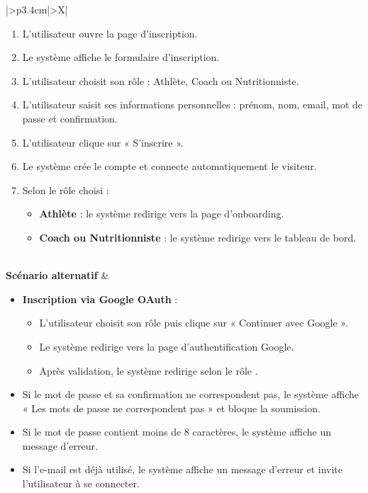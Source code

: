 \documentclass[a4paper,12pt]{report}
\begin{document}
\begin{table}[H]
\begin{tabularx}{\textwidth}{|>{\RaggedRight\arraybackslash}p{3.4cm}|>{\RaggedRight\arraybackslash}X|}
\begin{minipage}[t]{\linewidth}
\begin{enumerate}[label=\arabic*., leftmargin=*, topsep=0pt, itemsep=1pt]
    \item L'utilisateur ouvre la page d'inscription.
    \item Le système affiche le formulaire d'inscription.
    \item L'utilisateur choisit son rôle : Athlète, Coach ou Nutritionniste. 
    \item L'utilisateur saisit ses informations personnelles : prénom, nom, email, mot de passe et confirmation. 
    \item L'utilisateur clique sur « S'inscrire ».
    \item Le système crée le compte et connecte automatiquement le visiteur.
    \item Selon le rôle choisi :
    \begin{itemize}[leftmargin=*, topsep=1pt, itemsep=1pt]
        \item \textbf{Athlète} : le système redirige vers la page d'onboarding.
        \item \textbf{Coach ou Nutritionniste} : le système redirige vers le tableau de bord.
    \end{itemize}
\end{enumerate}
\vspace{2pt}
\end{minipage} \\
\hline
\textbf{Scénario alternatif} &
\begin{minipage}[t]{\linewidth}
\vspace{2pt}
\begin{itemize}[leftmargin=*, topsep=0pt, itemsep=1pt]
    \item \textbf{Inscription via Google OAuth} :
    \begin{itemize}[leftmargin=*, topsep=1pt, itemsep=1pt]
        \item L'utilisateur choisit son rôle 
puis clique sur « Continuer avec Google ».
        \item Le système redirige vers la page d'authentification Google.
        \item Après validation, le système redirige selon le rôle .
    \end{itemize}
    \item  Si le  mot de passe et sa confirmation ne correspondent pas, le système affiche « Les mots de passe ne correspondent pas » et bloque la soumission.
    \item Si le mot de passe contient moins de 8 caractères, le système affiche un message d'erreur.
    \item  Si l'e-mail est déjà utilisé, le système affiche un message d'erreur et invite l'utilisateur à se connecter.
\end{itemize}
\vspace{2pt}
\end{minipage} \\
\hline
\end{tabularx}
\fussy
\end{table}
\end{document}
